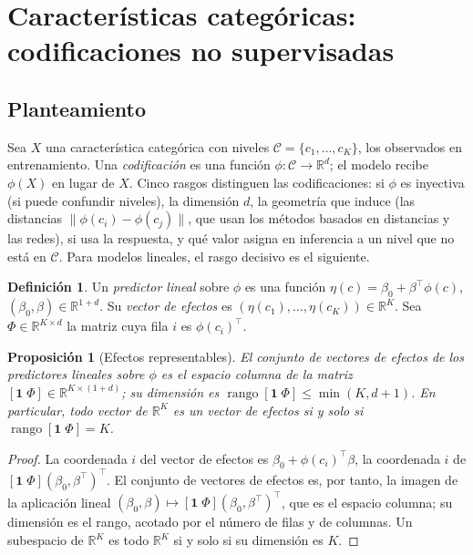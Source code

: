 \documentclass[11pt,a4paper]{article}
\theoremstyle{plain}
\newtheorem{proposicion}[teorema]{Proposición}
\theoremstyle{definition}
\newtheorem{definicion}[teorema]{Definición}
\theoremstyle{remark}
\newcommand{\R}{\mathbb{R}}
\newcommand{\rango}{\operatorname{rango}}
\newcommand{\1}{\mathbf{1}}
\begin{document}
\section{Características categóricas: codificaciones no supervisadas}

\subsection{Planteamiento}

Sea $X$ una característica categórica con niveles
$\mathcal C=\{c_1,\dots,c_K\}$, los observados en entrenamiento. Una
\emph{codificación} es una función $\phi:\mathcal C\to\R^d$; el modelo
recibe $\phi(X)$ en lugar de $X$. Cinco rasgos distinguen las
codificaciones: si $\phi$ es inyectiva (si puede confundir niveles), la
dimensión $d$, la geometría que induce (las distancias
$\|\phi(c_i)-\phi(c_j)\|$, que usan los métodos basados en distancias y
las redes), si usa la respuesta, y qué valor asigna en inferencia a un
nivel que no está en $\mathcal C$. Para modelos lineales, el rasgo decisivo
es el siguiente.

\begin{definicion}
Un \emph{predictor lineal} sobre $\phi$ es una función
$\eta(c)=\beta_0+\beta^\top\phi(c)$, $(\beta_0,\beta)\in\R^{1+d}$. Su
\emph{vector de efectos} es $(\eta(c_1),\dots,\eta(c_K))\in\R^K$. Sea
$\Phi\in\R^{K\times d}$ la matriz cuya fila $i$ es $\phi(c_i)^\top$.
\end{definicion}

\begin{proposicion}[Efectos representables]\label{prop:repr}
El conjunto de vectores de efectos de los predictores lineales sobre
$\phi$ es el espacio columna de la matriz $[\1\;\Phi]\in\R^{K\times(1+d)}$;
su dimensión es $\rango[\1\;\Phi]\le\min(K,d+1)$. En particular, todo
vector de $\R^K$ es un vector de efectos si y solo si
$\rango[\1\;\Phi]=K$.
\end{proposicion}

\begin{proof}
La coordenada $i$ del vector de efectos es
$\beta_0+\phi(c_i)^\top\beta$, la coordenada $i$ de
$[\1\;\Phi](\beta_0,\beta^\top)^\top$. El conjunto de vectores de efectos
es, por tanto, la imagen de la aplicación lineal
$(\beta_0,\beta)\mapsto[\1\;\Phi](\beta_0,\beta^\top)^\top$, que es el
espacio columna; su dimensión es el rango, acotado por el número de filas
y de columnas. Un subespacio de $\R^K$ es todo $\R^K$ si y solo si su
dimensión es $K$.
\end{proof}
\end{document}
